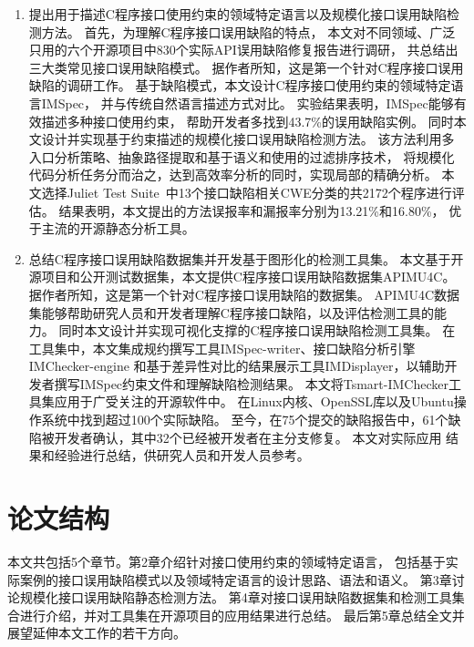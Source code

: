 \begin{enumerate}
	\item 提出用于描述C程序接口使用约束的领域特定语言以及规模化接口误用缺陷检测方法。
	首先，为理解C程序接口误用缺陷的特点，
	本文对不同领域、广泛只用的六个开源项目中830个实际API误用缺陷修复报告进行调研，
	共总结出三大类常见接口误用缺陷模式。
	据作者所知，这是第一个针对C程序接口误用缺陷的调研工作。
	基于缺陷模式，本文设计C程序接口使用约束的领域特定语言IMSpec，
	并与传统自然语言描述方式对比。
	实验结果表明，IMSpec能够有效描述多种接口使用约束，
	帮助开发者多找到43.7\%的误用缺陷实例。
	同时本文设计并实现基于约束描述的规模化接口误用缺陷检测方法。
	该方法利用多入口分析策略、抽象路径提取和基于语义和使用的过滤排序技术，
	将规模化代码分析任务分而治之，达到高效率分析的同时，实现局部的精确分析。
	本文选择Juliet Test Suite~\cite{juliet}中13个接口缺陷相关CWE分类的共2172个程序进行评估。
	结果表明，本文提出的方法误报率和漏报率分别为13.21\%和16.80\%，
	优于主流的开源静态分析工具。
	
	\item 总结C程序接口误用缺陷数据集并开发基于图形化的检测工具集。
	本文基于开源项目和公开测试数据集，本文提供C程序接口误用缺陷数据集APIMU4C。
	据作者所知，这是第一个针对C程序接口误用缺陷的数据集。
	APIMU4C数据集能够帮助研究人员和开发者理解C程序接口缺陷，以及评估检测工具的能力。
	同时本文设计并实现可视化支撑的C程序接口误用缺陷检测工具集。
	在工具集中，本文集成规约撰写工具IMSpec-writer、接口缺陷分析引擎IMChecker-engine
	和基于差异性对比的结果展示工具IMDisplayer，以辅助开发者撰写IMSpec约束文件和理解缺陷检测结果。
	本文将Tsmart-IMChecker工具集应用于广受关注的开源软件中。
	在Linux内核、OpenSSL库以及Ubuntu操作系统中找到超过100个实际缺陷。
	至今，在75个提交的缺陷报告中，61个缺陷被开发者确认，其中32个已经被开发者在主分支修复。
	本文对实际应用 结果和经验进行总结，供研究人员和开发人员参考。
	
	
	
\end{enumerate}
\section{论文结构}
本文共包括5个章节。第2章介绍针对接口使用约束的领域特定语言，
包括基于实际案例的接口误用缺陷模式以及领域特定语言的设计思路、语法和语义。
第3章讨论规模化接口误用缺陷静态检测方法。
第4章对接口误用缺陷数据集和检测工具集合进行介绍，并对工具集在开源项目的应用结果进行总结。
最后第5章总结全文并展望延伸本文工作的若干方向。
